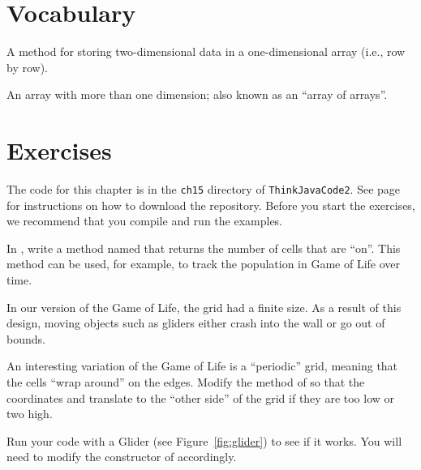 \section{Vocabulary}

\begin{description}

A method for storing two-dimensional data in a one-dimensional array (i.e., row by row).

An array with more than one dimension; also known as an ``array of arrays''.


\end{description}


\section{Exercises}

The code for this chapter is in the {\tt ch15} directory of {\tt ThinkJavaCode2}.
See page~\pageref{code} for instructions on how to download the repository.
Before you start the exercises, we recommend that you compile and run the examples.


\begin{exercise}
In , write a method named  that returns the number of cells that are ``on''.
This method can be used, for example, to track the population in Game of Life over time.
\end{exercise}


\begin{exercise}
In our version of the Game of Life, the grid had a finite size.
As a result of this design, moving objects such as gliders either crash into the wall or go out of bounds.

An interesting variation of the Game of Life is a ``periodic'' grid, meaning that the cells ``wrap around'' on the edges.
Modify the  method of  so that the coordinates  and  translate to the ``other side'' of the grid if they are too low or two high.

Run your code with a Glider (see Figure~\ref{fig:glider}) to see if it works.
You will need to modify the constructor of  accordingly.
\end{exercise}




